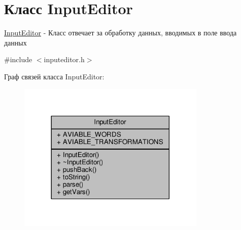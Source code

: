 \hypertarget{class_input_editor}{}\section{Класс Input\+Editor}
\label{class_input_editor}


\hyperlink{class_input_editor}{Input\+Editor} -\/ Класс отвечает за обработку данных, вводимых в поле ввода данных  




{\ttfamily \#include $<$inputeditor.\+h$>$}



Граф связей класса Input\+Editor\+:\nopagebreak
\begin{figure}[H]
\begin{center}
\leavevmode
\includegraphics[width=254pt]{class_input_editor__coll__graph}
\end{center}
\end{figure}
